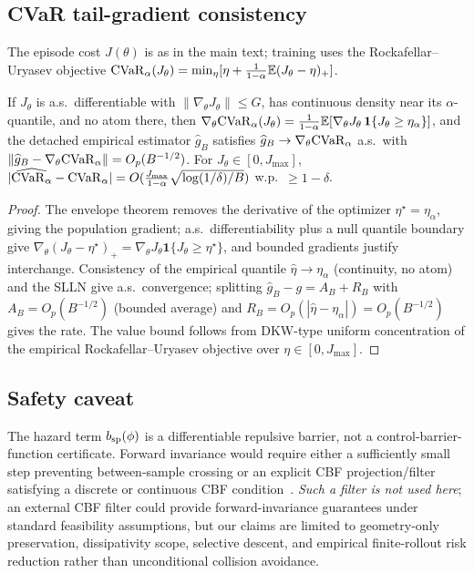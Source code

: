 \subsection{CVaR tail-gradient consistency}
The episode cost $J(\theta)$ is as in the main text; training uses the
Rockafellar--Uryasev objective
$\mathrm{CVaR}_{\alpha}(J_\theta)=\min_\eta[\eta+\tfrac1{1-\alpha}\mathbb E(J_\theta-\eta)_+]$.
\begin{theorem}\label{thm:cvar}
If $J_\theta$ is a.s.\ differentiable with $\|\nabla_\theta J_\theta\|\le G$, has
continuous density near its $\alpha$-quantile, and no atom there, then
$\nabla_\theta\mathrm{CVaR}_{\alpha}(J_\theta)=\tfrac1{1-\alpha}\mathbb E[\nabla_\theta J_\theta\,
\mathbf 1\{J_\theta\ge\eta_\alpha\}]$, and the detached empirical estimator
$\widehat g_B$ satisfies $\widehat g_B\to\nabla_\theta\mathrm{CVaR}_{\alpha}$ a.s.\ with
$\|\widehat g_B-\nabla_\theta\mathrm{CVaR}_{\alpha}\|=O_p(B^{-1/2})$. For
$J_\theta\in[0,J_{\max}]$,
$|\widehat{\mathrm{CVaR}_{\alpha}}-\mathrm{CVaR}_{\alpha}|=O(\tfrac{J_{\max}}{1-\alpha}\sqrt{\log(1/\delta)/B})$
w.p.\ $\ge1-\delta$.
\begin{equation}\label{eq:app:cvar}\end{equation}
\end{theorem}
\begin{proof}
The envelope theorem removes the derivative of the optimizer $\eta^\star=\eta_\alpha$,
giving the population gradient; a.s.\ differentiability plus a null quantile
boundary give
$\nabla_\theta(J_\theta-\eta^\star)_+=\nabla_\theta J_\theta\mathbf 1\{J_\theta\ge\eta^\star\}$,
and bounded gradients justify interchange. Consistency of the empirical quantile
$\widehat\eta\to\eta_\alpha$ (continuity, no atom) and the SLLN give a.s.\
convergence; splitting $\widehat g_B-g=A_B+R_B$ with $A_B=O_p(B^{-1/2})$ (bounded
average) and $R_B=O_p(|\widehat\eta-\eta_\alpha|)=O_p(B^{-1/2})$ gives the rate.
The value bound follows from DKW-type uniform concentration of the empirical
Rockafellar--Uryasev objective over $\eta\in[0,J_{\max}]$.
\end{proof}

\subsection{Safety caveat}
\label{app:safety_caveat}
The hazard term $b_{\rm sp}(\phi)$ is a differentiable repulsive barrier, not a
control-barrier-function certificate. Forward invariance would require either a
sufficiently small step preventing between-sample crossing or an explicit CBF
projection/filter satisfying a discrete or continuous CBF
condition~\citep{ames2016control}. \emph{Such a filter is not used here}; an
external CBF filter could provide forward-invariance guarantees under standard
feasibility assumptions, but our claims are limited to geometry-only
preservation, dissipativity scope, selective descent, and empirical
finite-rollout risk reduction rather than unconditional collision avoidance.

